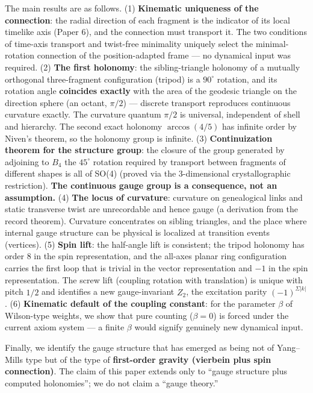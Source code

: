 \documentclass[
]{ltjsarticle}
\begin{document}
The main results are as follows. (1) \textbf{Kinematic uniqueness of the
connection}: the radial direction of each fragment is the indicator of
its local timelike axis (Paper 6), and the connection must transport it.
The two conditions of time-axis transport and twist-free minimality
uniquely select the minimal-rotation connection of the position-adapted
frame --- no dynamical input was required. (2) \textbf{The first
holonomy}: the sibling-triangle holonomy of a mutually orthogonal
three-fragment configuration (tripod) is a \(90^\circ\) rotation, and
its rotation angle \textbf{coincides exactly} with the area of the
geodesic triangle on the direction sphere (an octant, \(\pi/2\)) ---
discrete transport reproduces continuous curvature exactly. The
curvature quantum \(\pi/2\) is universal, independent of shell and
hierarchy. The second exact holonomy \(\arccos(4/5)\) has infinite order
by Niven's theorem, so the holonomy group is infinite. (3)
\textbf{Continuization theorem for the structure group}: the closure of
the group generated by adjoining to \(B_4\) the \(45^\circ\) rotation
required by transport between fragments of different shapes is all of
SO(4) (proved via the 3-dimensional crystallographic restriction).
\textbf{The continuous gauge group is a consequence, not an assumption.}
(4) \textbf{The locus of curvature}: curvature on genealogical links and
static transverse twist are unrecordable and hence gauge (a derivation
from the record theorem). Curvature concentrates on sibling triangles,
and the place where internal gauge structure can be physical is
localized at transition events (vertices). (5) \textbf{Spin lift}: the
half-angle lift is consistent; the tripod holonomy has order 8 in the
spin representation, and the all-axes planar ring configuration carries
the first loop that is trivial in the vector representation and \(-1\)
in the spin representation. The screw lift (coupling rotation with
translation) is unique with pitch \(1/2\) and identifies a new
gauge-invariant \(Z_2\), the excitation parity \((-1)^{\Sigma|k|}\). (6)
\textbf{Kinematic default of the coupling constant}: for the parameter
\(\beta\) of Wilson-type weights, we show that pure counting
(\(\beta=0\)) is forced under the current axiom system --- a finite
\(\beta\) would signify genuinely new dynamical input.

Finally, we identify the gauge structure that has emerged as being not
of Yang--Mills type but of the type of \textbf{first-order gravity
(vierbein plus spin connection)}. The claim of this paper extends only
to ``gauge structure plus computed holonomies''; we do not claim a
``gauge theory.''
\end{document}
